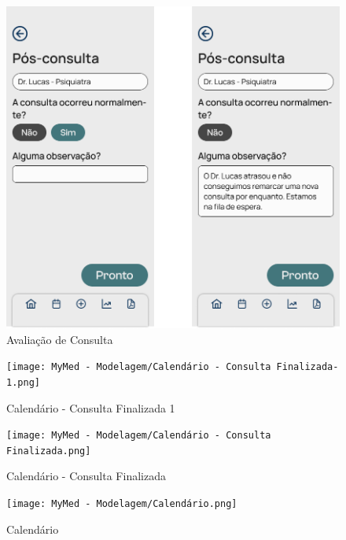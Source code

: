\pagebreak

\begin{figure}[!htbp]
	\centering
	\includegraphics[width=1.0\linewidth]{MyMed - Modelagem/Avaliação Consulta.png}
	\caption{Avaliação de Consulta}
	\label{avaliacao_consulta}
\end{figure}

\begin{figure}[!htbp]
	\centering
	\texttt{[image: MyMed - Modelagem/Calendário - Consulta Finalizada-1.png]}
	\caption{Calendário - Consulta Finalizada 1}
	\label{calendario_consulta_finalizada_1}
\end{figure}

\begin{figure}[!htbp]
	\centering
	\texttt{[image: MyMed - Modelagem/Calendário - Consulta Finalizada.png]}
	\caption{Calendário - Consulta Finalizada}
	\label{calendario_consulta_finalizada}
\end{figure}

\begin{figure}[!htbp]
	\centering
	\texttt{[image: MyMed - Modelagem/Calendário.png]}
	\caption{Calendário}
	\label{calendario}
\end{figure}

